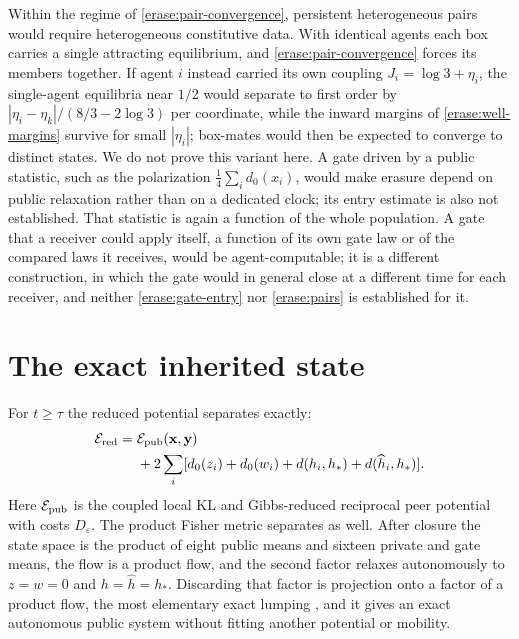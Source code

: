 Within the regime of \cref{erase:pair-convergence}, persistent heterogeneous pairs would require heterogeneous constitutive data. With identical agents each box carries a single attracting equilibrium, and \cref{erase:pair-convergence} forces its members together. If agent $i$ instead carried its own coupling $J_i=\log3+\eta_i$, the single-agent equilibria near $1/2$ would separate to first order by $|\eta_i-\eta_k|/(8/3-2\log3)$ per coordinate, while the inward margins of \cref{erase:well-margins} survive for small $|\eta_i|$; box-mates would then be expected to converge to distinct states. We do not prove this variant here. A gate driven by a public statistic, such as the polarization $\frac14\sum_id_0(x_i)$, would make erasure depend on public relaxation rather than on a dedicated clock; its entry estimate is also not established. That statistic is again a function of the whole population. A gate that a receiver could apply itself, a function of its own gate law or of the compared laws it receives, would be agent-computable; it is a different construction, in which the gate would in general close at a different time for each receiver, and neither \cref{erase:gate-entry} nor \cref{erase:pairs} is established for it.

\section{The exact inherited state}

For $t\geq\tau$ the reduced potential separates exactly:
\begin{equation}
 \begin{split}
 \mathcal E_{\rm red}={}&\mathcal E_{\rm pub}(\mathbf x,\mathbf y)\\
 &+2\sum_i[d_0(z_i)+d_0(w_i)
                +d(h_i,h_*)+d(\widehat h_i,h_*)].
 \end{split}
 \label{erase:separated-energy}
\end{equation}
Here $\mathcal E_{\rm pub}$ is the coupled local KL and Gibbs-reduced reciprocal peer potential with costs $D_\varepsilon$. The product Fisher metric separates as well. After closure the state space is the product of eight public means and sixteen private and gate means, the flow is a product flow, and the second factor relaxes autonomously to $z=w=0$ and $h=\widehat h=h_*$. Discarding that factor is projection onto a factor of a product flow, the most elementary exact lumping \citep{HorstmeyerAtay2016}, and it gives an exact autonomous public system without fitting another potential or mobility.

